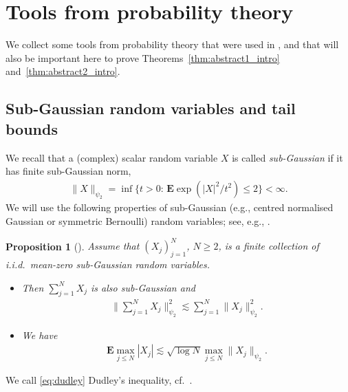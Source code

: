 \documentclass[12pt,reqno]{amsart}
\newtheorem{proposition}[theorem]{Proposition}
\theoremstyle{definition}
\theoremstyle{remark}
\numberwithin{equation}{section}
\newcommand{\1}{\mathbbm{1}}
\begin{document}


\section{Tools from probability theory}
\label{s:abstracttools}

We collect some tools from probability theory that were used in \cite{CueninMerz2025}, and that will also be important here to prove Theorems~\ref{thm:abstract1_intro} and~\ref{thm:abstract2_intro}.

\subsection{Sub-Gaussian random variables and tail bounds}
We recall that a (complex) scalar random variable $X$ is called \emph{sub-Gaussian} if it has finite sub-Gaussian norm,
\begin{align*}
  \|X\|_{\psi_2}=\inf\{t>0:\,\mathbf{E}\exp(|X|^2/t^2)\leq 2\}<\infty.
\end{align*}
We will use the following properties of sub-Gaussian (e.g., centred normalised Gaussian or symmetric Bernoulli) random variables; see, e.g., \cite[Proposition~2.6.1 and Exercise~2.5.10]{Vershynin2018}.

\begin{proposition}[{\cite[Proposition~21]{CueninMerz2025}}]
  \label{prop. properties of subgaussian rv}
  Assume that $(X_j)_{j=1}^{N}$, $N\geq 2$, is a finite collection of i.i.d.~mean-zero sub-Gaussian random variables. 
  \begin{itemize}
  \item[(i)] Then $\sum_{j=1}^{N} X_j$ is also sub-Gaussian and
    \begin{align*}
      \|\sum_{j=1}^{N} X_j\|_{\psi_2}^2
      \lesssim \sum_{j=1}^{N}\|X_j\|_{\psi_2}^2.
    \end{align*} 
  \item[(ii)] We have
    \begin{align}
      \label{eq:dudley}
      \mathbf{E}\max_{j\leq N}|X_j|
      \lesssim \sqrt{\log N}\max_{j\leq N}\|X_j\|_{\psi_2}.
    \end{align}
  \end{itemize}
\end{proposition}
We call \eqref{eq:dudley} Dudley's inequality, cf.~\cite[Section~8.1]{Vershynin2018}.
\end{document}
